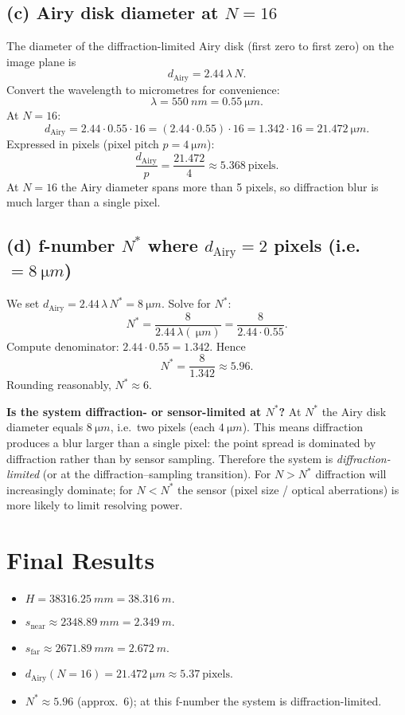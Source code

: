 \documentclass[12pt,a4paper]{article}
\begin{document}
\bigskip

\subsection*{(c) Airy disk diameter at \(N=16\)}

The diameter of the diffraction-limited Airy disk (first zero to first zero) on the image plane is
\[
d_{\text{Airy}} = 2.44\,\lambda\,N.
\]
Convert the wavelength to micrometres for convenience:
\[
\lambda=\SI{550}{nm}=\SI{0.55}{\micro m}.
\]
At \(N=16\):
\[
d_{\text{Airy}} = 2.44\cdot 0.55\cdot 16
= (2.44\cdot 0.55)\cdot 16 = 1.342\cdot 16 = \SI{21.472}{\micro m}.
\]
Expressed in pixels (pixel pitch \(p=\SI{4}{\micro m}\)):
\[
\frac{d_{\text{Airy}}}{p}=\frac{21.472}{4}\approx\boxed{5.368\ \text{pixels}}.
\]
At \(N=16\) the Airy diameter spans more than 5 pixels, so diffraction blur is much larger than a single pixel.

\bigskip

\subsection*{(d) f-number \(N^\ast\) where \(d_{\text{Airy}}=2\) pixels (i.e.\ \(=\SI{8}{\micro m}\))}

We set \(d_{\text{Airy}}=2.44\,\lambda\,N^\ast = \SI{8}{\micro m}\). Solve for \(N^\ast\):
\[
N^\ast = \frac{8}{2.44\,\lambda(\SI{}{\micro m})} = \frac{8}{2.44\cdot 0.55}.
\]
Compute denominator: \(2.44\cdot 0.55 = 1.342\). Hence
\[
N^\ast = \frac{8}{1.342}\approx \boxed{5.96}.
\]
Rounding reasonably, \(N^\ast\approx 6\).

\textbf{Is the system diffraction- or sensor-limited at \(N^\ast\)?}  
At \(N^\ast\) the Airy disk diameter equals \(\SI{8}{\micro m}\), i.e.\ two pixels (each \(\SI{4}{\micro m}\)). This means diffraction produces a blur larger than a single pixel: the point spread is dominated by diffraction rather than by sensor sampling. Therefore the system is \emph{diffraction-limited} (or at the diffraction–sampling transition). For \(N>N^\ast\) diffraction will increasingly dominate; for \(N<N^\ast\) the sensor (pixel size / optical aberrations) is more likely to limit resolving power.

\bigskip

\section*{Final Results}
\begin{itemize}
  \item \(H=\SI{38316.25}{mm}=\SI{38.316}{m}.\)
  \item \(s_{\text{near}}\approx\SI{2348.89}{mm}=\SI{2.349}{m}.\)
  \item \(s_{\text{far}}\approx\SI{2671.89}{mm}=\SI{2.672}{m}.\)
  \item \(d_{\text{Airy}}(N=16)=\SI{21.472}{\micro m}\approx 5.37\ \text{pixels}.\)
  \item \(N^\ast\approx 5.96\) (approx.\ \(6\)); at this f-number the system is diffraction-limited.
\end{itemize}
\end{document}
